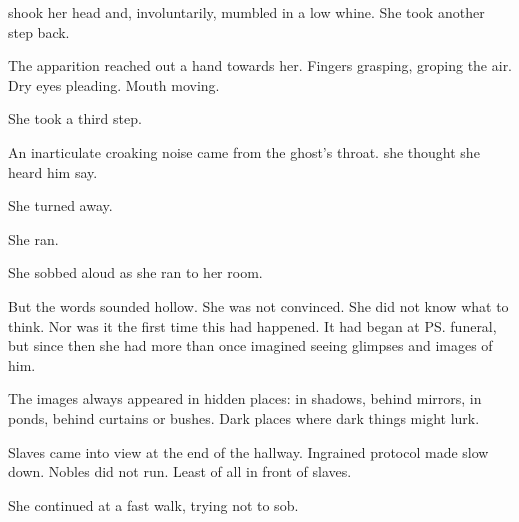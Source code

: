\Tiroco{} shook her head and, involuntarily, mumbled in a low whine. 
She took another step back.

The apparition reached out a hand towards her. 
Fingers grasping, groping the air. 
Dry eyes pleading. 
Mouth moving. 

She took a third step. 

An inarticulate croaking noise came from the ghost's throat. 
 she thought she heard him say. 

She turned away. 

She ran. 


She sobbed aloud as she ran to her room. 




But the words sounded hollow. 
She was not convinced. 
She did not know what to think. 
Nor was it the first time this had happened. 
It had began at \ps{\Icor}{} funeral, but since then she had more than once imagined seeing glimpses and images of him. 

The images always appeared in hidden places: in shadows, behind mirrors, in ponds, behind curtains or bushes. 
Dark places where dark things might lurk. 

Slaves came into view at the end of the hallway. 
Ingrained protocol made \Tiroco{} slow down. 
Nobles did not run. 
Least of all in front of slaves. 

She continued at a fast walk, trying not to sob. 





